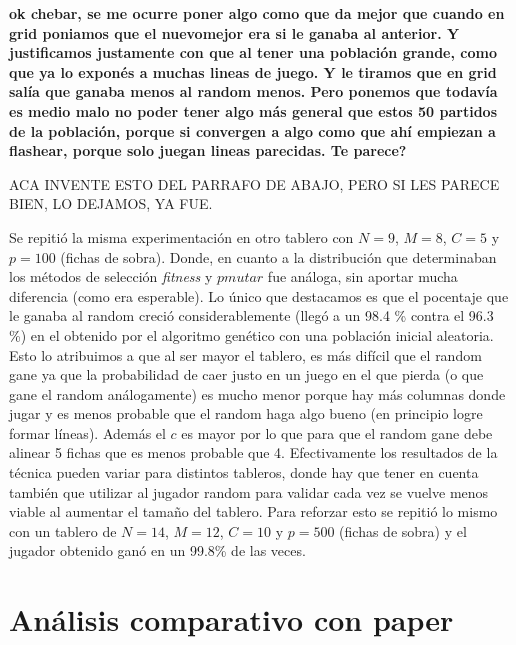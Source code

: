\documentclass[A4paper,oneside,fleqn,11pt]{article}
\theoremstyle{definition}
\begin{document}
\textbf{ok chebar, se me ocurre poner algo como que da mejor que cuando en grid poniamos que el nuevomejor era si le ganaba al anterior. Y justificamos justamente con que al tener una población grande, como que ya lo exponés a muchas lineas de juego. Y le tiramos que en grid salía que ganaba menos al random menos. Pero ponemos que todavía es medio malo no poder tener algo más general que estos 50 partidos de la población, porque si convergen a algo como que ahí empiezan a flashear, porque solo juegan lineas parecidas. Te parece?}




ACA INVENTE ESTO DEL PARRAFO DE ABAJO, PERO SI LES PARECE BIEN, LO DEJAMOS, YA FUE.

Se repitió la misma experimentación en otro tablero con $N=9$, $M=8$, $C=5$ y $p=100$ (fichas de sobra). Donde, en cuanto a la distribución que determinaban los métodos de selección \textit{fitness} y $pmutar$ fue análoga, sin aportar mucha diferencia (como era esperable). Lo único que destacamos es que el pocentaje que le ganaba al random creció considerablemente (llegó a un 98.4 \% contra el 96.3 \%) en el obtenido por el algoritmo genético con una población inicial aleatoria. Esto lo atribuimos a que al ser mayor el tablero, es más difícil que el random gane ya que la probabilidad de caer justo en un juego en el que pierda (o que gane el random análogamente) es mucho menor porque hay más columnas donde jugar y es menos probable que el random haga algo bueno (en principio logre formar líneas). Además el $c$ es mayor por lo que para que el random gane debe alinear 5 fichas que es menos probable que 4. Efectivamente los resultados de la técnica pueden variar para distintos tableros, donde hay que tener en cuenta también que utilizar al jugador random para validar cada vez se vuelve menos viable al aumentar el tamaño del tablero. Para reforzar esto se repitió lo mismo con un tablero de $N=14$, $M=12$, $C=10$ y $p=500$ (fichas de sobra) y el jugador obtenido ganó en un 99.8\% de las veces.



\section{Análisis comparativo con paper}
\end{document}
